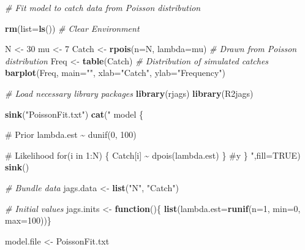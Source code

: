 \documentclass[
]{krantz}
\makeatletter
\newenvironment{Shaded}{\begin{snugshade}}{\end{snugshade}}
\newcommand{\AttributeTok}[1]{\textcolor[rgb]{0.27,0.27,0.27}{#1}}
\newcommand{\CommentTok}[1]{\textcolor[rgb]{0.37,0.37,0.37}{\textit{#1}}}
\newcommand{\ConstantTok}[1]{\textcolor[rgb]{0.37,0.37,0.37}{#1}}
\newcommand{\ControlFlowTok}[1]{\textcolor[rgb]{0.27,0.27,0.27}{\textbf{#1}}}
\newcommand{\DecValTok}[1]{\textcolor[rgb]{0.06,0.06,0.06}{#1}}
\newcommand{\FunctionTok}[1]{\textcolor[rgb]{0.27,0.27,0.27}{\textbf{#1}}}
\newcommand{\NormalTok}[1]{#1}
\newcommand{\OtherTok}[1]{\textcolor[rgb]{0.37,0.37,0.37}{#1}}
\newcommand{\StringTok}[1]{\textcolor[rgb]{0.5,0.5,0.5}{#1}}
\newenvironment{kframe}{%
\medskip{}
\setlength{\fboxsep}{.8em}
 \def\at@end@of@kframe{}%
 \ifinner\ifhmode%
  \def\at@end@of@kframe{\end{minipage}}%
  \begin{minipage}{\columnwidth}%
 \fi\fi%
 \def\FrameCommand##1{\hskip\@totalleftmargin \hskip-\fboxsep
 \colorbox{shadecolor}{##1}\hskip-\fboxsep
     \hskip-\linewidth \hskip-\@totalleftmargin \hskip\columnwidth}%
 \MakeFramed {\advance\hsize-\width
   \@totalleftmargin\z@ \linewidth\hsize
   \@setminipage}}%
 {\par\unskip\endMakeFramed%
 \at@end@of@kframe}
\renewenvironment{Shaded}{\begin{kframe}}{\end{kframe}}
\makeatother
\begin{document}
\begin{Shaded}
\begin{Highlighting}[]
\CommentTok{\# Fit model to catch data from Poisson distribution}

\FunctionTok{rm}\NormalTok{(}\AttributeTok{list=}\FunctionTok{ls}\NormalTok{()) }\CommentTok{\# Clear Environment}

\NormalTok{N }\OtherTok{\textless{}{-}} \DecValTok{30}
\NormalTok{mu }\OtherTok{\textless{}{-}} \DecValTok{7}
\NormalTok{Catch }\OtherTok{\textless{}{-}} \FunctionTok{rpois}\NormalTok{(}\AttributeTok{n=}\NormalTok{N, }\AttributeTok{lambda=}\NormalTok{mu) }\CommentTok{\# Drawn from Poisson distribution}
\NormalTok{Freq }\OtherTok{\textless{}{-}} \FunctionTok{table}\NormalTok{(Catch)  }\CommentTok{\# Distribution of simulated catches}
\FunctionTok{barplot}\NormalTok{(Freq, }\AttributeTok{main=}\StringTok{""}\NormalTok{, }\AttributeTok{xlab=}\StringTok{"Catch"}\NormalTok{, }\AttributeTok{ylab=}\StringTok{"Frequency"}\NormalTok{)}

\CommentTok{\# Load necessary library packages}
\FunctionTok{library}\NormalTok{(rjags)}
\FunctionTok{library}\NormalTok{(R2jags)}

\FunctionTok{sink}\NormalTok{(}\StringTok{"PoissonFit.txt"}\NormalTok{)}
\FunctionTok{cat}\NormalTok{(}\StringTok{"}
\StringTok{model \{}

\StringTok{\# Prior}
\StringTok{ lambda.est \textasciitilde{} dunif(0, 100)}

\StringTok{\# Likelihood}
\StringTok{    for(i in 1:N) \{}
\StringTok{      Catch[i] \textasciitilde{} dpois(lambda.est)}
\StringTok{      \} \#y}
\StringTok{\}}
\StringTok{    "}\NormalTok{,}\AttributeTok{fill=}\ConstantTok{TRUE}\NormalTok{)}
\FunctionTok{sink}\NormalTok{()}

\CommentTok{\# Bundle data}
\NormalTok{jags.data }\OtherTok{\textless{}{-}} \FunctionTok{list}\NormalTok{(}\StringTok{"N"}\NormalTok{, }\StringTok{"Catch"}\NormalTok{)}

\CommentTok{\# Initial values}
\NormalTok{jags.inits }\OtherTok{\textless{}{-}} \ControlFlowTok{function}\NormalTok{()\{ }\FunctionTok{list}\NormalTok{(}\AttributeTok{lambda.est=}\FunctionTok{runif}\NormalTok{(}\AttributeTok{n=}\DecValTok{1}\NormalTok{, }\AttributeTok{min=}\DecValTok{0}\NormalTok{, }\AttributeTok{max=}\DecValTok{100}\NormalTok{))\}}

\NormalTok{model.file }\OtherTok{\textless{}{-}} \StringTok{\textquotesingle{}PoissonFit.txt\textquotesingle{}}


\end{Highlighting}
\end{Shaded}
\end{document}
